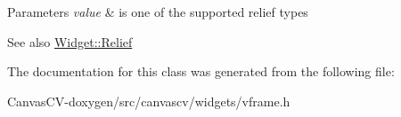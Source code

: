 \begin{DoxyParams}{Parameters}
{\em value} & is one of the supported relief types \\
\hline
\end{DoxyParams}
\begin{DoxySeeAlso}{See also}
\hyperlink{classcanvascv_1_1Widget_a8253daa509c55c24c92ce0d3dd93e4cd}{Widget\+::\+Relief} 
\end{DoxySeeAlso}


The documentation for this class was generated from the following file\+:\begin{DoxyCompactItemize}
\item 
Canvas\+C\+V-\/doxygen/src/canvascv/widgets/vframe.\+h\end{DoxyCompactItemize}
